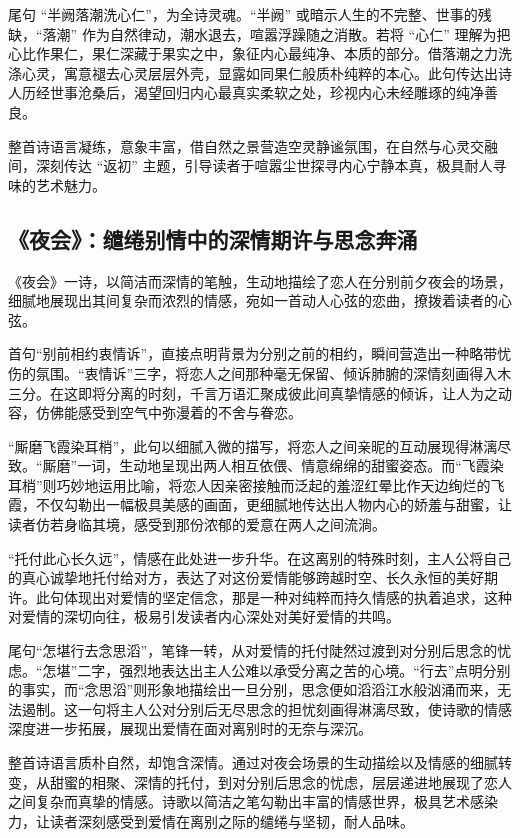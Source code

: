 \documentclass{article}
\begin{document}
尾句 “半阙落潮洗心仁”，为全诗灵魂。“半阙” 或暗示人生的不完整、世事的残缺，“落潮” 作为自然律动，潮水退去，喧嚣浮躁随之消散。若将 “心仁” 理解为把心比作果仁，果仁深藏于果实之中，象征内心最纯净、本质的部分。借落潮之力洗涤心灵，寓意褪去心灵层层外壳，显露如同果仁般质朴纯粹的本心。此句传达出诗人历经世事沧桑后，渴望回归内心最真实柔软之处，珍视内心未经雕琢的纯净善良。

整首诗语言凝练，意象丰富，借自然之景营造空灵静谧氛围，在自然与心灵交融间，深刻传达 “返初” 主题，引导读者于喧嚣尘世探寻内心宁静本真，极具耐人寻味的艺术魅力。

\subsection{《夜会》：缱绻别情中的深情期许与思念奔涌}\label{sec:ye-hui}

《夜会》一诗，以简洁而深情的笔触，生动地描绘了恋人在分别前夕夜会的场景，细腻地展现出其间复杂而浓烈的情感，宛如一首动人心弦的恋曲，撩拨着读者的心弦。

首句“别前相约衷情诉”，直接点明背景为分别之前的相约，瞬间营造出一种略带忧伤的氛围。“衷情诉”三字，将恋人之间那种毫无保留、倾诉肺腑的深情刻画得入木三分。在这即将分离的时刻，千言万语汇聚成彼此间真挚情感的倾诉，让人为之动容，仿佛能感受到空气中弥漫着的不舍与眷恋。

“厮磨飞霞染耳梢”，此句以细腻入微的描写，将恋人之间亲昵的互动展现得淋漓尽致。“厮磨”一词，生动地呈现出两人相互依偎、情意绵绵的甜蜜姿态。而“飞霞染耳梢”则巧妙地运用比喻，将恋人因亲密接触而泛起的羞涩红晕比作天边绚烂的飞霞，不仅勾勒出一幅极具美感的画面，更细腻地传达出人物内心的娇羞与甜蜜，让读者仿若身临其境，感受到那份浓郁的爱意在两人之间流淌。

“托付此心长久远”，情感在此处进一步升华。在这离别的特殊时刻，主人公将自己的真心诚挚地托付给对方，表达了对这份爱情能够跨越时空、长久永恒的美好期许。此句体现出对爱情的坚定信念，那是一种对纯粹而持久情感的执着追求，这种对爱情的深切向往，极易引发读者内心深处对美好爱情的共鸣。

尾句“怎堪行去念思滔”，笔锋一转，从对爱情的托付陡然过渡到对分别后思念的忧虑。“怎堪”二字，强烈地表达出主人公难以承受分离之苦的心境。“行去”点明分别的事实，而“念思滔”则形象地描绘出一旦分别，思念便如滔滔江水般汹涌而来，无法遏制。这一句将主人公对分别后无尽思念的担忧刻画得淋漓尽致，使诗歌的情感深度进一步拓展，展现出爱情在面对离别时的无奈与深沉。

整首诗语言质朴自然，却饱含深情。通过对夜会场景的生动描绘以及情感的细腻转变，从甜蜜的相聚、深情的托付，到对分别后思念的忧虑，层层递进地展现了恋人之间复杂而真挚的情感。诗歌以简洁之笔勾勒出丰富的情感世界，极具艺术感染力，让读者深刻感受到爱情在离别之际的缱绻与坚韧，耐人品味。
\end{document}
